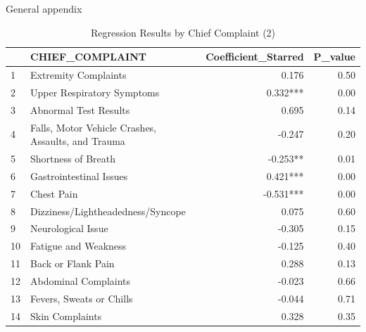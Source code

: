 \documentclass[,,nonblindrev]{informs}
\begin{document}
\begin{APPENDIX}{General appendix}
\begin{table}[ht]
\centering
\caption{Regression Results by Chief Complaint (2)} 
\begin{tabular}{llrr}
  \hline
 & CHIEF\_COMPLAINT & Coefficient\_Starred & P\_value \\ 
  \hline
1 & Extremity Complaints & 0.176 & 0.50 \\ 
  2 & Upper Respiratory Symptoms & 0.332*** & 0.00 \\ 
  3 & Abnormal Test Results & 0.695 & 0.14 \\ 
  4 & Falls, Motor Vehicle Crashes, Assaults, and Trauma & -0.247 & 0.20 \\ 
  5 & Shortness of Breath & -0.253** & 0.01 \\ 
  6 & Gastrointestinal Issues & 0.421*** & 0.00 \\ 
  7 & Chest Pain & -0.531*** & 0.00 \\ 
  8 & Dizziness/Lightheadedness/Syncope & 0.075 & 0.60 \\ 
  9 & Neurological Issue & -0.305 & 0.15 \\ 
  10 & Fatigue and Weakness & -0.125 & 0.40 \\ 
  11 & Back or Flank Pain & 0.288 & 0.13 \\ 
  12 & Abdominal Complaints & -0.023 & 0.66 \\ 
  13 & Fevers, Sweats or Chills & -0.044 & 0.71 \\ 
  14 & Skin Complaints & 0.328 & 0.35 \\ 
   \hline
\end{tabular}
\end{table}


\end{APPENDIX}
\end{document}
